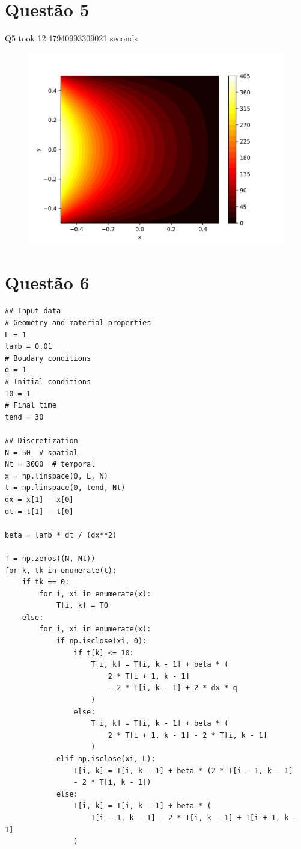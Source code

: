 \documentclass{article}
\begin{document}
\section{Questão 5}
Q5 took 12.47940993309021 seconds
\begin{figure}[h]
\centering
  \includegraphics[width=.8\textwidth]{figs/q5_colorbar.png}
	\label{fig:q5_colobar}
\end{figure}

\section{Questão 6}

\begin{lstlisting}
## Input data
# Geometry and material properties
L = 1
lamb = 0.01
# Boudary conditions
q = 1
# Initial conditions
T0 = 1
# Final time
tend = 30

## Discretization
N = 50  # spatial
Nt = 3000  # temporal
x = np.linspace(0, L, N)
t = np.linspace(0, tend, Nt)
dx = x[1] - x[0]
dt = t[1] - t[0]

beta = lamb * dt / (dx**2)

T = np.zeros((N, Nt))
for k, tk in enumerate(t):
    if tk == 0:
        for i, xi in enumerate(x):
            T[i, k] = T0
    else:
        for i, xi in enumerate(x):
            if np.isclose(xi, 0):
                if t[k] <= 10:
                    T[i, k] = T[i, k - 1] + beta * (
                        2 * T[i + 1, k - 1] 
                        - 2 * T[i, k - 1] + 2 * dx * q
                    )
                else:
                    T[i, k] = T[i, k - 1] + beta * (
                        2 * T[i + 1, k - 1] - 2 * T[i, k - 1]
                    )
            elif np.isclose(xi, L):
                T[i, k] = T[i, k - 1] + beta * (2 * T[i - 1, k - 1]
                - 2 * T[i, k - 1])
            else:
                T[i, k] = T[i, k - 1] + beta * (
                    T[i - 1, k - 1] - 2 * T[i, k - 1] + T[i + 1, k - 1]
                )
\end{lstlisting}
\end{document}
